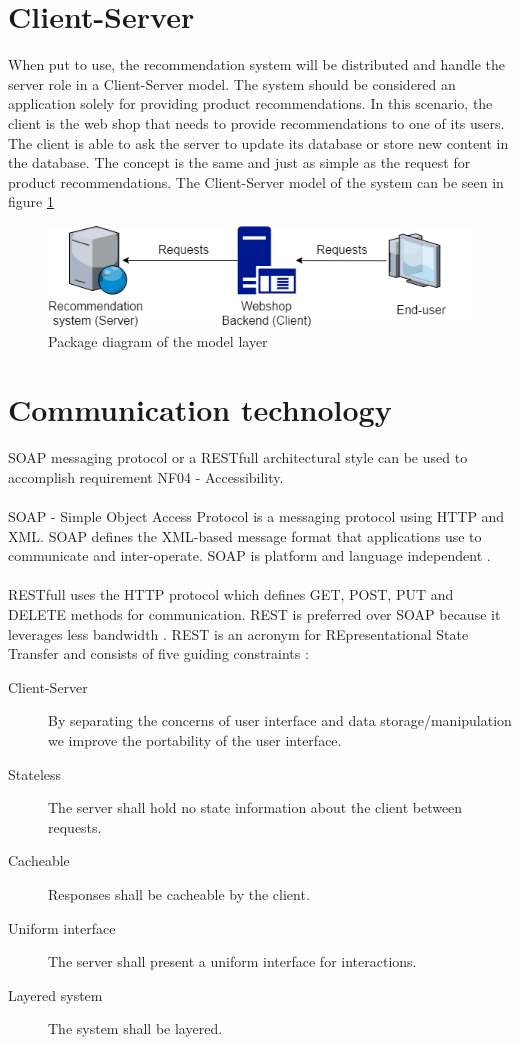 \section{Client-Server}
When put to use, the recommendation system will be distributed and handle the server role in a Client-Server model. The system should be considered an application solely for providing product recommendations. In this scenario, the client is the web shop that needs to provide recommendations to one of its users. The client is able to ask the server to update its database or store new content in the database. The concept is the same and just as simple as the request for product recommendations. The Client-Server model of the system can be seen in figure \ref{fig:ClientServer}

\begin{figure}[H]
	\centering
	\includegraphics[width=.8\linewidth]{Figures/ClientServer.png}
	\caption{Package diagram of the model layer}
	\label{fig:ClientServer}
\end{figure}

\section{Communication technology}
SOAP messaging protocol or a RESTfull architectural style can be used to accomplish requirement NF04 - Accessibility.\\\\ SOAP - Simple Object Access Protocol is a messaging protocol using HTTP and XML. SOAP defines the XML-based message format that applications use to communicate and inter-operate. SOAP is platform and language independent \cite{SOAP}. \\\\ RESTfull uses the HTTP protocol which defines GET, POST, PUT and DELETE methods for communication. REST is preferred over SOAP because it leverages less bandwidth \cite{restfull}. 
REST is an acronym for REpresentational State Transfer and consists of five guiding constraints \cite{rest}:
\begin{description}
\item [Client-Server] By separating the concerns of user interface and data storage/manipulation we improve the portability of the user interface.
\item [Stateless] The server shall hold no state information about the client between requests.
\item [Cacheable] Responses shall be cacheable by the client.
\item [Uniform interface] The server shall present a uniform interface for interactions.
\item [Layered system] The system shall be layered.
\end{description}



